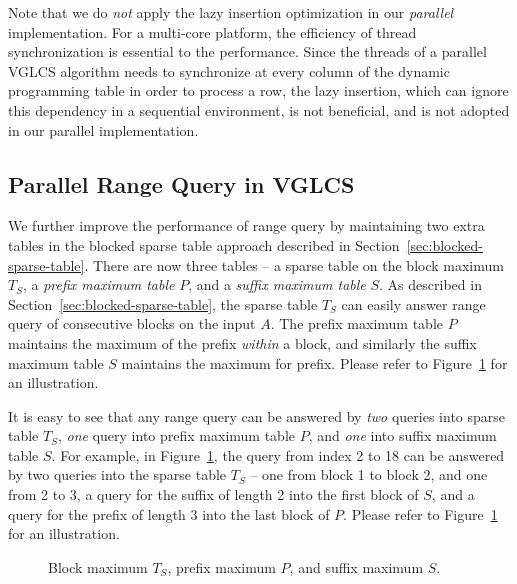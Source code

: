 Note that we do {\em not} apply the lazy insertion optimization in our
{\em parallel} implementation.  For a multi-core platform, the
efficiency of thread synchronization is essential to the performance.
Since the threads of a parallel VGLCS algorithm needs to synchronize at
every column of the dynamic programming table in order to process a row,
the lazy insertion, which can ignore this dependency in a sequential
environment, is not beneficial, and is not adopted in our parallel
implementation.

\subsection{Parallel Range Query in VGLCS}

We further improve the performance of range query by maintaining two
extra tables in the blocked sparse table approach described in
Section~\ref{sec:blocked-sparse-table}.  There are now three tables -- a
sparse table on the block maximum $T_S$, a {\em prefix maximum table}
$P$, and a {\em suffix maximum table} $S$.  As described in
Section~\ref{sec:blocked-sparse-table}, the sparse table $T_S$ can
easily answer range query of consecutive blocks on the input $A$.  The
prefix maximum table $P$ maintains the maximum of the prefix {\em
within} a block, and similarly the suffix maximum table $S$ maintains
the maximum for prefix.  Please refer to
Figure~\ref{fig:compressed-sp-opt} for an illustration.

It is easy to see that any range query can be answered by {\em two}
queries into sparse table $T_S$, {\em one} query into prefix maximum
table $P$, and {\em one} into suffix maximum table $S$.  For example, in
Figure~\ref{fig:compressed-sp-opt}, the query from index 2 to 18 can be
answered by two queries into the sparse table $T_S$ -- one from block 1
to block 2, and one from 2 to 3, a query for the suffix of length 2 into
the first block of $S$, and a query for the prefix of length 3 into the
last block of $P$.  Please refer to Figure~\ref{fig:compressed-sp-opt}
for an illustration.



\begin{figure}[!thb]
  \centering {}  \caption{Block maximum $T_S$, prefix maximum $P$, and suffix maximum $S$.}
  \label{fig:compressed-sp-opt}
\end{figure}

